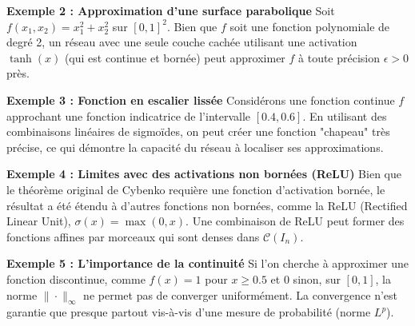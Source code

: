 \documentclass[11pt,a4paper]{article}
\begin{document}
\textbf{Exemple 2 : Approximation d'une surface parabolique}
Soit $f(x_1, x_2) = x_1^2 + x_2^2$ sur $[0, 1]^2$. Bien que $f$ soit une fonction polynomiale de degré 2, un réseau avec une seule couche cachée utilisant une activation $\tanh(x)$ (qui est continue et bornée) peut approximer $f$ à toute précision $\epsilon > 0$ près.

\textbf{Exemple 3 : Fonction en escalier lissée}
Considérons une fonction continue $f$ approchant une fonction indicatrice de l'intervalle $[0.4, 0.6]$. En utilisant des combinaisons linéaires de sigmoïdes, on peut créer une fonction "chapeau" très précise, ce qui démontre la capacité du réseau à localiser ses approximations.

\textbf{Exemple 4 : Limites avec des activations non bornées (ReLU)}
Bien que le théorème original de Cybenko requière une fonction d'activation bornée, le résultat a été étendu à d'autres fonctions non bornées, comme la ReLU (Rectified Linear Unit), $\sigma(x) = \max(0, x)$. Une combinaison de ReLU peut former des fonctions affines par morceaux qui sont denses dans $\mathcal{C}(I_n)$.

\textbf{Exemple 5 : L'importance de la continuité}
Si l'on cherche à approximer une fonction discontinue, comme $f(x) = 1$ pour $x \ge 0.5$ et $0$ sinon, sur $[0,1]$, la norme $\|\cdot\|_\infty$ ne permet pas de converger uniformément. La convergence n'est garantie que presque partout vis-à-vis d'une mesure de probabilité (norme $L^p$).

\begin{center}
\end{center}

\begin{center}
\end{center}
\end{document}
